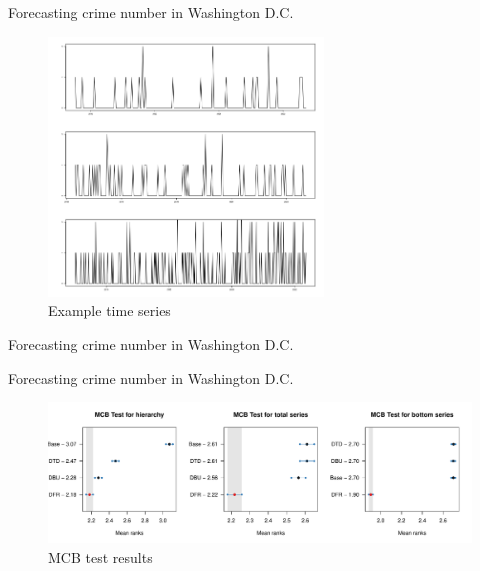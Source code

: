 \documentclass[12pt]{beamer}
\begin{document}
\begin{frame}{Forecasting crime number in Washington D.C.}
\begin{figure}
\centering
\includegraphics[width=0.65\textwidth]{figures/dc.png}
\caption{Example time series}
\end{figure}
\end{frame}


\begin{frame}{Forecasting crime number in Washington D.C.}
\begin{table}[h]
    \centering
    \caption{Summarised Brier Score($\times 10^{-2}$) of test samples in crime forecasting application.}
    \end{table}
\end{frame}

\begin{frame}{Forecasting crime number in Washington D.C.}
\begin{figure}
\centering
\includegraphics[width=\textwidth]{../manuscript/figures/dc_crime_mcb.pdf}
\caption{MCB test results}
\end{figure}
\end{frame}
\end{document}
